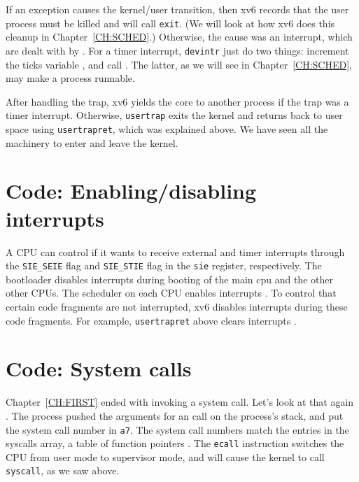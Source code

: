 If an exception causes the kernel/user transition, then xv6 records
that the user process must be killed and will call \lstinline{exit}.
(We will look at how xv6 does this cleanup in Chapter~\ref{CH:SCHED}.)
Otherwise, the cause was an interrupt, which are dealt with by
.  For a timer
interrupt, \lstinline{devintr} just do two things: increment the ticks
variable , and call
.  The latter, as
we will see in Chapter~\ref{CH:SCHED}, may make a process runnable.

After handling the trap, xv6 yields
the core to another process if the trap was a timer interrupt.
Otherwise, \lstinline{usertrap} exits the kernel and returns back to
user space using \lstinline{usertrapret}, which was explained above.
We have seen all the machinery to enter and leave the kernel.
 
\section{Code: Enabling/disabling interrupts}

A CPU can control if it wants to receive external and timer
interrupts through the \lstinline{SIE_SEIE}
 flag and \lstinline{SIE_STIE}
 flag in the \texttt{sie}
register, respectively.  The bootloader disables interrupts during
booting of the main cpu and the other other CPUs.  The scheduler on
each CPU enables interrupts .  To
control that certain code fragments are not interrupted, xv6 disables
interrupts during these code fragments.  For example,
\lstinline{usertrapret} above clears interrupts
.

\section{Code: System calls}

Chapter~\ref{CH:FIRST} ended with 
invoking a system call.
Let's look at that again
.
The process pushed the arguments
for an 
call on the process's stack, and put the
system call number in
\texttt{a7}.
The system call numbers match the entries in the syscalls array,
a table of function pointers
.
The \lstinline{ecall} instruction
switches the CPU from user mode to supervisor mode, and will
cause the kernel to call \lstinline{syscall}, as we saw above.

